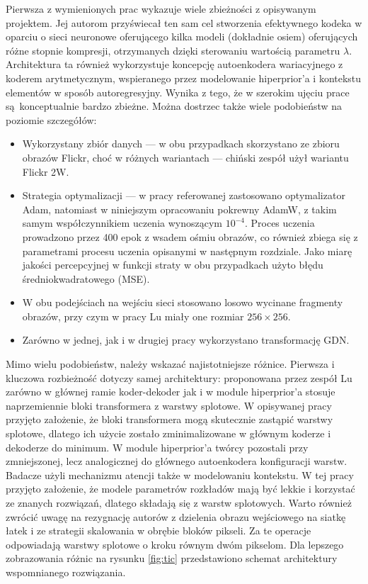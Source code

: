 Pierwsza z wymienionych prac wykazuje wiele zbieżności z opisywanym projektem. Jej autorom przyświecał ten sam cel stworzenia efektywnego kodeka w oparciu o sieci neuronowe oferującego kilka modeli (dokładnie osiem) oferujących różne stopnie kompresji, otrzymanych dzięki sterowaniu wartością parametru \(\lambda\). Architektura ta również wykorzystuje koncepcję autoenkodera wariacyjnego z koderem arytmetycznym, wspieranego przez modelowanie hiperprior'a i kontekstu elementów w sposób autoregresyjny. Wynika z tego, że w szerokim ujęciu prace są konceptualnie bardzo zbieżne. Można dostrzec także wiele podobieństw na poziomie szczegółów:
\begin{itemize}
	\item Wykorzystany zbiór danych --- w obu przypadkach skorzystano ze zbioru obrazów Flickr, choć w różnych wariantach --- chiński zespół użył wariantu Flickr 2W.
	\item Strategia optymalizacji --- w pracy referowanej zastosowano optymalizator Adam, natomiast w niniejszym opracowaniu pokrewny AdamW, z takim samym współczynnikiem uczenia wynoszącym \(10^{-4}\). Proces uczenia prowadzono przez 400 epok z wsadem ośmiu obrazów, co również zbiega się z parametrami procesu uczenia opisanymi w następnym rozdziale. Jako miarę jakości percepcyjnej w funkcji straty w obu przypadkach użyto błędu średniokwadratowego (MSE).
	\item W obu podejściach na wejściu sieci stosowano losowo wycinane fragmenty obrazów, przy czym w pracy Lu miały one rozmiar \(256 \times 256\).
	\item Zarówno w jednej, jak i w drugiej pracy wykorzystano transformację GDN.
	\end{itemize}

Mimo wielu podobieństw, należy wskazać najistotniejsze różnice. Pierwsza i kluczowa rozbieżność dotyczy samej architektury: proponowana przez zespół Lu zarówno w głównej ramie koder-dekoder jak i w module hiperprior'a stosuje naprzemiennie bloki transformera z warstwy splotowe. W opisywanej pracy przyjęto założenie, że bloki transformera mogą skutecznie zastąpić warstwy splotowe, dlatego ich użycie zostało zminimalizowane w głównym koderze i dekoderze do minimum. W module hiperprior'a twórcy pozostali przy zmniejszonej, lecz analogicznej do głównego autoenkodera konfiguracji warstw. Badacze użyli mechanizmu atencji także w modelowaniu kontekstu. W tej pracy przyjęto założenie, że modele parametrów rozkładów mają być lekkie i korzystać ze znanych rozwiązań, dlatego składają się z warstw splotowych. Warto również zwrócić uwagę na rezygnację autorów z dzielenia obrazu wejściowego na siatkę łatek i ze strategii skalowania w obrębie bloków pikseli. Za te operacje odpowiadają warstwy splotowe o kroku równym dwóm pikselom. Dla lepszego zobrazowania różnic na rysunku \ref{fig:tic} przedstawiono schemat architektury wspomnianego rozwiązania.

